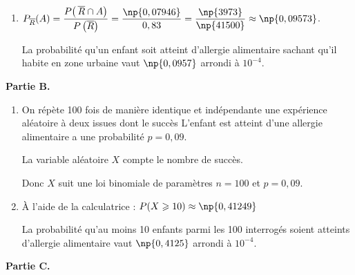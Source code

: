 \begin{enumerate}
\begin{enumerate}
On a donc : \quad $0,09 = 0,01054 +P\big(\,\overline{R}\cap A\big) $

D'où  $P\big(\,\overline{R}\cap A\big) = 0,09-\np{0,01054}=\np{0,07946}$

La probabilité que l'enfant interrogé habite en zone urbaine et soit atteint d'allergie alimentaire vaut $\np{0,07946}$.

		\item $P_{\overline{R}}(A)=\dfrac{P\big(\,\overline{R}\cap A\big)}{P\left(\overline{R}\right)}= \dfrac{\np{0,07946}}{0,83}= \dfrac{\np{3973}}{\np{41500}}\approx \np{0,09573}$.

La probabilité qu'un enfant  soit atteint d'allergie alimentaire sachant qu'il habite en zone urbaine vaut $\np{0,0957}$ arrondi à $10^{-4}$.
	\end{enumerate}
\end{enumerate}

\smallskip

\textbf{Partie B.}

\medskip

\begin{enumerate}
\item On répète 100 fois de manière identique et indépendante une expérience aléatoire à deux issues dont le succès \og L'enfant est atteint d'une allergie alimentaire \fg{}  a une probabilité $p = 0,09$.

La variable aléatoire $X$ compte le nombre de succès.

Donc $X$ suit une loi binomiale de paramètres $n=100$ et $p = 0,09$.
\item À l'aide de la calculatrice : $P(X \geqslant 10)\approx \np{0,41249}$

La probabilité qu'au moins 10 enfants parmi les 100 interrogés soient atteints d'allergie alimentaire vaut $\np{0,4125}$ arrondi à $10^{-4}$.
\end{enumerate}

\smallskip

\textbf{Partie C.}

\medskip

